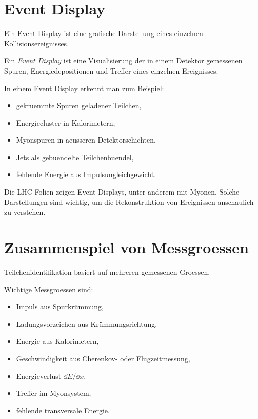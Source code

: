 \section{Event Display}

Ein Event Display ist eine grafische Darstellung eines einzelnen Kollisionsereignisses.

\begin{definitionbox}
Ein \emph{Event Display} ist eine Visualisierung der in einem Detektor gemessenen
Spuren, Energiedepositionen und Treffer eines einzelnen Ereignisses.
\end{definitionbox}

\begin{conceptbox}
In einem Event Display erkennt man zum Beispiel:
\begin{itemize}
    \item gekruemmte Spuren geladener Teilchen,
    \item Energiecluster in Kalorimetern,
    \item Myonspuren in aeusseren Detektorschichten,
    \item Jets als gebuendelte Teilchenbuendel,
    \item fehlende Energie aus Impulsungleichgewicht.
\end{itemize}
\end{conceptbox}

\begin{notebox}
Die LHC-Folien zeigen Event Displays, unter anderem mit Myonen.
Solche Darstellungen sind wichtig, um die Rekonstruktion von Ereignissen anschaulich
zu verstehen.
\end{notebox}

\section{Zusammenspiel von Messgroessen}

Teilchenidentifikation basiert auf mehreren gemessenen Groessen.

\begin{conceptbox}
Wichtige Messgroessen sind:
\begin{itemize}
    \item Impuls aus Spurkrümmung,
    \item Ladungsvorzeichen aus Krümmungsrichtung,
    \item Energie aus Kalorimetern,
    \item Geschwindigkeit aus Cherenkov- oder Flugzeitmessung,
    \item Energieverlust $\dd E/\dd x$,
    \item Treffer im Myonsystem,
    \item fehlende transversale Energie.
\end{itemize}
\end{conceptbox}

